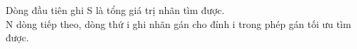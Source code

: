 Dòng đầu tiên ghi S là tổng giá trị nhãn tìm được.
\\N dòng tiếp theo, dòng thứ i ghi nhãn gán cho đỉnh i trong phép gán tối ưu tìm được.

\